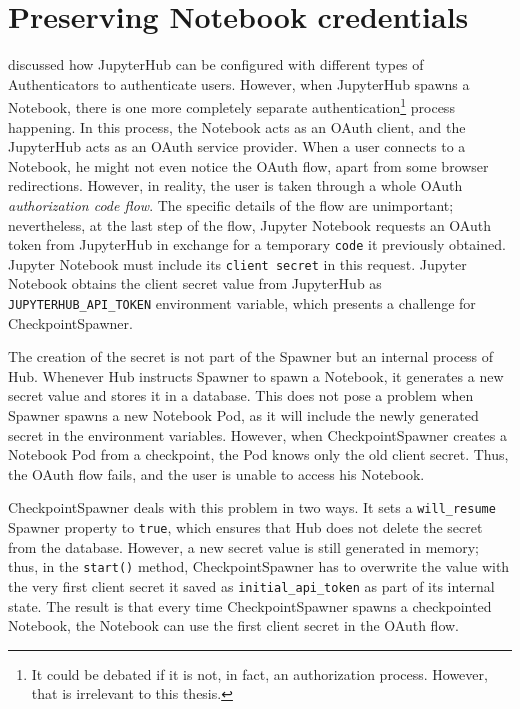 \documentclass[
  digital,     %
  oneside,     %
  nosansbold,  %
  nocolorbold, %
  lof,         %
  nolot,         %
]{fithesis4}
\begin{document}
\section{Preserving Notebook credentials}
 discussed how JupyterHub can be configured with different types of Authenticators to authenticate users. However, when JupyterHub spawns a Notebook, there is one more completely separate authentication\footnote{It could be debated if it is not, in fact, an authorization process. However, that is irrelevant to this thesis.} process happening. In this process, the Notebook acts as an OAuth client, and the JupyterHub acts as an OAuth service provider. When a user connects to a Notebook, he might not even notice the OAuth flow, apart from some browser redirections. However, in reality, the user is taken through a whole OAuth \emph{authorization code flow}. The specific details of the flow are unimportant; nevertheless, at the last step of the flow, Jupyter Notebook requests an OAuth token from JupyterHub in exchange for a temporary \texttt{code} it previously obtained. Jupyter Notebook must include its \texttt{client secret} in this request. Jupyter Notebook obtains the client secret value from JupyterHub as \texttt{JUPYTERHUB\_API\_TOKEN} environment variable, which presents a challenge for CheckpointSpawner.

The creation of the secret is not part of the Spawner but an internal process of Hub. Whenever Hub instructs Spawner to spawn a Notebook, it generates a new secret value and stores it in a database. This does not pose a problem when Spawner spawns a new Notebook Pod, as it will include the newly generated secret in the environment variables. However, when CheckpointSpawner creates a Notebook Pod from a checkpoint, the Pod knows only the old client secret. Thus, the OAuth flow fails, and the user is unable to access his Notebook.

CheckpointSpawner deals with this problem in two ways. It sets a \texttt{will\_resume} Spawner property to \texttt{true}, which ensures that Hub does not delete the secret from the database. However, a new secret value is still generated in memory; thus, in the \texttt{start()} method, CheckpointSpawner has to overwrite the value with the very first client secret it saved as \texttt{initial\_api\_token} as part of its internal state. The result is that every time CheckpointSpawner spawns a checkpointed Notebook, the Notebook can use the first client secret in the OAuth flow.
\end{document}
